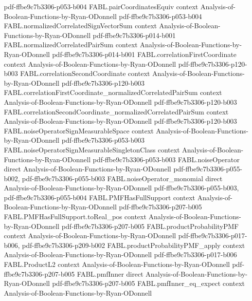 \begin{theorem}
  {pdf-ffbe9c7b3306-p053-b004}
\proofstep
  {FABL.pairCoordinatesEquiv}
  {context}
  {Analysis-of-Boolean-Functions-by-Ryan-ODonnell}
  {pdf-ffbe9c7b3306-p053-b004}
\proofstep
  {FABL.normalizedCorrelatedSignVectorSum}
  {context}
  {Analysis-of-Boolean-Functions-by-Ryan-ODonnell}
  {pdf-ffbe9c7b3306-p014-b001}
\proofstep
  {FABL.normalizedCorrelatedPairSum}
  {context}
  {Analysis-of-Boolean-Functions-by-Ryan-ODonnell}
  {pdf-ffbe9c7b3306-p014-b001}
\proofstep
  {FABL.correlationFirstCoordinate}
  {context}
  {Analysis-of-Boolean-Functions-by-Ryan-ODonnell}
  {pdf-ffbe9c7b3306-p120-b003}
\proofstep
  {FABL.correlationSecondCoordinate}
  {context}
  {Analysis-of-Boolean-Functions-by-Ryan-ODonnell}
  {pdf-ffbe9c7b3306-p120-b003}
\proofstep
  {FABL.correlationFirstCoordinate_normalizedCorrelatedPairSum}
  {context}
  {Analysis-of-Boolean-Functions-by-Ryan-ODonnell}
  {pdf-ffbe9c7b3306-p120-b003}
\proofstep
  {FABL.correlationSecondCoordinate_normalizedCorrelatedPairSum}
  {context}
  {Analysis-of-Boolean-Functions-by-Ryan-ODonnell}
  {pdf-ffbe9c7b3306-p120-b003}
\proofstep
  {FABL.noiseOperatorSignMeasurableSpace}
  {context}
  {Analysis-of-Boolean-Functions-by-Ryan-ODonnell}
  {pdf-ffbe9c7b3306-p053-b003}
\proofstep
  {FABL.noiseOperatorSignMeasurableSingletonClass}
  {context}
  {Analysis-of-Boolean-Functions-by-Ryan-ODonnell}
  {pdf-ffbe9c7b3306-p053-b003}
\proofstep
  {FABL.noiseOperator}
  {direct}
  {Analysis-of-Boolean-Functions-by-Ryan-ODonnell}
  {pdf-ffbe9c7b3306-p055-b002,
    pdf-ffbe9c7b3306-p055-b003}
\proofstep
  {FABL.noiseOperator_monomial}
  {direct}
  {Analysis-of-Boolean-Functions-by-Ryan-ODonnell}
  {pdf-ffbe9c7b3306-p055-b003,
    pdf-ffbe9c7b3306-p055-b004}
\proofstep
  {FABL.PMFHasFullSupport}
  {context}
  {Analysis-of-Boolean-Functions-by-Ryan-ODonnell}
  {pdf-ffbe9c7b3306-p207-b005}
\proofstep
  {FABL.PMFHasFullSupport.toReal_pos}
  {context}
  {Analysis-of-Boolean-Functions-by-Ryan-ODonnell}
  {pdf-ffbe9c7b3306-p207-b005}
\proofstep
  {FABL.productProbabilityPMF}
  {context}
  {Analysis-of-Boolean-Functions-by-Ryan-ODonnell}
  {pdf-ffbe9c7b3306-p017-b006,
    pdf-ffbe9c7b3306-p209-b002}
\proofstep
  {FABL.productProbabilityPMF_apply}
  {context}
  {Analysis-of-Boolean-Functions-by-Ryan-ODonnell}
  {pdf-ffbe9c7b3306-p017-b006}
\proofstep
  {FABL.ProductL2}
  {context}
  {Analysis-of-Boolean-Functions-by-Ryan-ODonnell}
  {pdf-ffbe9c7b3306-p207-b005}
\proofstep
  {FABL.pmfInner}
  {direct}
  {Analysis-of-Boolean-Functions-by-Ryan-ODonnell}
  {pdf-ffbe9c7b3306-p207-b005}
\proofstep
  {FABL.pmfInner_eq_expect}
  {context}
  {Analysis-of-Boolean-Functions-by-Ryan-ODonnell}

\end{theorem}
